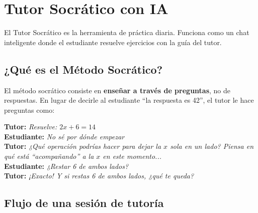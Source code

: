 \documentclass[12pt, a4paper]{article}
\begin{document}
\section{Tutor Socrático con IA}

El Tutor Socrático es la herramienta de práctica diaria. Funciona como un chat inteligente donde el estudiante resuelve ejercicios con la guía del tutor.

\subsection{¿Qué es el Método Socrático?}

El método socrático consiste en \textbf{enseñar a través de preguntas}, no de respuestas. En lugar de decirle al estudiante ``la respuesta es 42'', el tutor le hace preguntas como:

\begin{infobox}
\textbf{Tutor:} \textit{Resuelve: $2x + 6 = 14$}\\[3pt]
\textbf{Estudiante:} \textit{No sé por dónde empezar}\\[3pt]
\textbf{Tutor:} \textit{¿Qué operación podrías hacer para dejar la $x$ sola en un lado? Piensa en qué está ``acompañando'' a la $x$ en este momento...}\\[3pt]
\textbf{Estudiante:} \textit{¿Restar 6 de ambos lados?}\\[3pt]
\textbf{Tutor:} \textit{¡Exacto! Y si restas 6 de ambos lados, ¿qué te queda?}
\end{infobox}

\subsection{Flujo de una sesión de tutoría}
\end{document}
